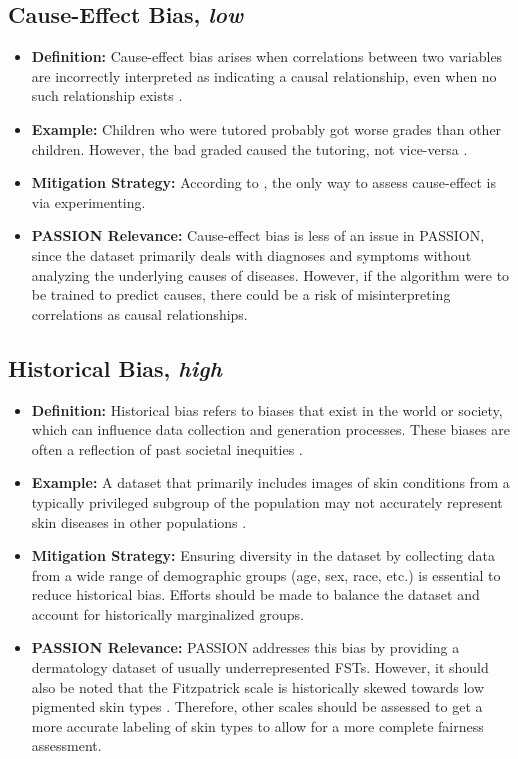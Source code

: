 \documentclass[12pt, a4paper, oneside]{book}   	%
\begin{document}
\begin{appendices}
		\subsection{Cause-Effect Bias, \textit{low}}
		\begin{itemize}
			\item \textbf{Definition:} Cause-effect bias arises when correlations between two variables are incorrectly interpreted as indicating a causal relationship, even when no such relationship exists \autocite{Mester_2017}.
			\item \textbf{Example:} Children who were tutored probably got worse grades than other children. However, the bad graded caused the tutoring, not vice-versa \autocite{Mester_2017}.
			\item \textbf{Mitigation Strategy:} According to \textcite{Mester_2017}, the only way to assess cause-effect is via experimenting.
			\item \textbf{PASSION Relevance:} Cause-effect bias is less of an issue in PASSION, since the dataset primarily deals with diagnoses and symptoms without analyzing the underlying causes of diseases. However, if the algorithm were to be trained to predict causes, there could be a risk of misinterpreting correlations as causal relationships.
		\end{itemize}
		
		\subsection{Historical Bias, \textit{high}}
		\begin{itemize}
			\item \textbf{Definition:} Historical bias refers to biases that exist in the world or society, which can influence data collection and generation processes. These biases are often a reflection of past societal inequities \autocite{M144_Suresh_2021}.
			\item \textbf{Example:} A dataset that primarily includes images of skin conditions from a typically privileged subgroup of the population may not accurately represent skin diseases in other populations \autocite{Mehrabi_2021}.
			\item \textbf{Mitigation Strategy:} Ensuring diversity in the dataset by collecting data from a wide range of demographic groups (age, sex, race, etc.) is essential to reduce historical bias. Efforts should be made to balance the dataset and account for historically marginalized groups.
			\item \textbf{PASSION Relevance:} PASSION addresses this bias by providing a dermatology dataset of usually underrepresented \glspl{FST}. However, it should also be noted that the Fitzpatrick scale is historically skewed towards low pigmented skin types \autocite{Montoya_2025}. Therefore, other scales should be assessed to get a more accurate labeling of skin types to allow for a more complete fairness assessment.
		\end{itemize}
		

\end{appendices}
\end{document}
